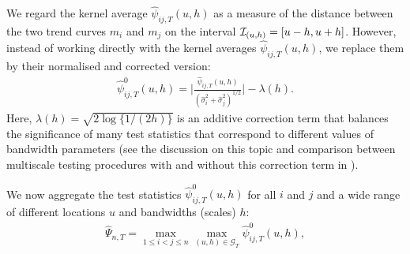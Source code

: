 \documentclass[a4paper,12pt]{article}
\begin{document}
We regard the kernel average $\widehat{\psi}_{ij, T}(u, h)$ as a measure of the distance between the two trend curves $m_i$ and $m_j$ on the interval $\mathcal{I}_{(u, h)} = [u-h, u+h]$. However, instead of working directly with the kernel averages $\widehat{\psi}_{ij, T}(u, h)$, we replace them by their normalised and corrected version:
\begin{align}\label{eq:psi_zero_ij}
\hat{\psi}^0_{ij, T}(u, h) =  \Big|\frac{\widehat{\psi}_{ij, T}(u, h)}{(\widehat{\sigma}_i^2 + \widehat{\sigma}_j^2)^{1/2}}\Big| - \lambda(h).
\end{align}
Here, $\lambda(h) = \sqrt{2 \log \{ 1/(2h) \}}$ is an additive correction term that balances the significance of many test statistics that correspond to different values of bandwidth parameters (see the discussion on this topic and comparison between multiscale testing procedures with and without this correction term in \citet{KhismatullinaVogt2020}).

We now aggregate the test statistics $\hat{\psi}^0_{ij, T}(u, h)$ for all $i$ and $j$ and a wide range of different locations $u$ and bandwidths (scales) $h$:
\begin{align}\label{eq:Psi_hat}
	\widehat{\Psi}_{n,T} = \max_{1 \le i < j \le n}\max_{(u, h) \in \mathcal{G}_T} \hat{\psi}^0_{ij, T}(u, h),
\end{align}
\end{document}

